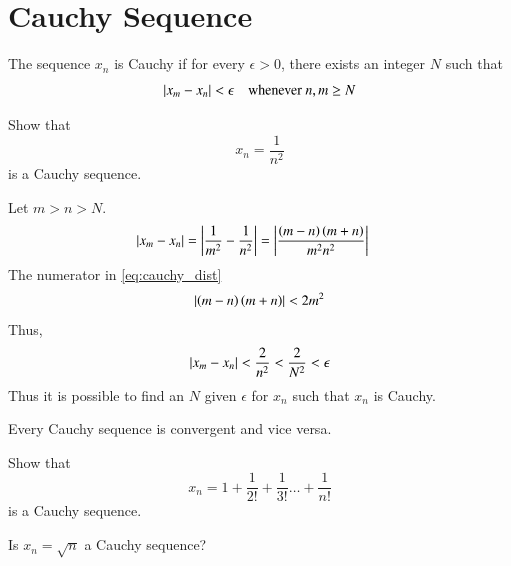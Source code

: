 \documentclass[journal,12pt,twocolumn]{IEEEtran}
\begin{document}
\section{Cauchy Sequence}
\begin{definition}
The sequence $x_n$ is Cauchy if for every $\epsilon > 0$, there exists an integer $N$ such that
\begin{equation}
\left\vert x_m-x_n\right\vert < \epsilon \quad \text{whenever } n,m \geq N 
\end{equation}
\end{definition}
\begin{problem}
Show that 
\begin{equation}
x_n = \frac{1}{n^2}
\end{equation}
is a Cauchy sequence.
\end{problem}
\proof Let $m > n > N$.
\begin{align}
\label{eq:cauchy_dist}
\left\vert x_m-x_n\right\vert &= \left\vert\frac{1}{m^2}-\frac{1}{n^2}\right\vert = \left\vert\frac{\left(m-n\right)\left(m+n\right)}{m^2n^2}\right\vert
\end{align}
The numerator in \eqref{eq:cauchy_dist}
\begin{equation}
\left\vert\left(m-n\right)\left(m+n\right)\right\vert < 2m^2
\end{equation}
Thus, 
\begin{equation}
\left\vert x_m-x_n\right\vert < \frac{2}{n^2} < \frac{2}{N^2} < \epsilon
\end{equation}
Thus it is possible to find an $N$ given $\epsilon$ for $x_n$ such that $x_n$ is Cauchy.
\begin{proposition}
Every Cauchy sequence is convergent and vice versa.
\end{proposition}
%
\begin{problem}
Show that
\begin{equation}
x_n = 1 + \frac{1}{2!}+ \frac{1}{3!}\dots + \frac{1}{n!}
\end{equation}
is a Cauchy sequence.
\end{problem}
\begin{problem}
Is $x_n = \sqrt{n}$ a Cauchy sequence?
\end{problem}
\end{document}
